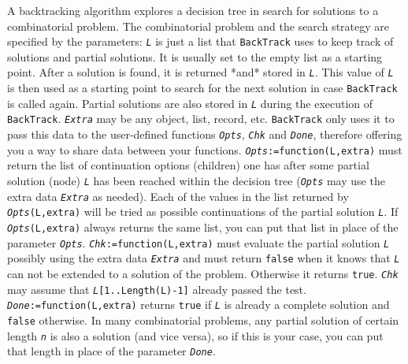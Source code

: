 \documentclass[a4paper,11pt]{report}
\begin{document}
{{{A backtracking algorithm explores a decision tree in search for solutions to a
combinatorial problem. The combinatorial problem and the search strategy are
specified by the parameters: \mbox{\texttt{\mdseries\slshape L}} is just a list that \texttt{BackTrack} uses to keep track of solutions and partial solutions. It is usually set to
the empty list as a starting point. After a solution is found, it is returned
*and* stored in \mbox{\texttt{\mdseries\slshape L}}. This value of \mbox{\texttt{\mdseries\slshape L}} is then used as a starting point to search for the next solution in case \texttt{BackTrack} is called again. Partial solutions are also stored in \mbox{\texttt{\mdseries\slshape L}} during the execution of \texttt{BackTrack}. \mbox{\texttt{\mdseries\slshape Extra}} may be any object, list, record, etc. \texttt{BackTrack} only uses it to pass this data to the user-defined functions \mbox{\texttt{\mdseries\slshape Opts}}, \mbox{\texttt{\mdseries\slshape Chk}} and \mbox{\texttt{\mdseries\slshape Done}}, therefore offering you a way to share data between your functions. \mbox{\texttt{\mdseries\slshape Opts}}\texttt{:=function(L,extra)} must return the list of continuation options (children) one has after some
partial solution (node) \mbox{\texttt{\mdseries\slshape L}} has been reached within the decision tree (\mbox{\texttt{\mdseries\slshape Opts}} may use the extra data \mbox{\texttt{\mdseries\slshape Extra}} as needed). Each of the values in the list returned by \mbox{\texttt{\mdseries\slshape Opts}}\texttt{(L,extra)} will be tried as possible continuations of the partial solution \mbox{\texttt{\mdseries\slshape L}}. If \mbox{\texttt{\mdseries\slshape Opts}}\texttt{(L,extra)} always returns the same list, you can put that list in place of the parameter \mbox{\texttt{\mdseries\slshape Opts}}. \mbox{\texttt{\mdseries\slshape Chk}}\texttt{:=function(L,extra)} must evaluate the partial solution \mbox{\texttt{\mdseries\slshape L}} possibly using the extra data \mbox{\texttt{\mdseries\slshape Extra}} and must return \texttt{false} when it knows that \mbox{\texttt{\mdseries\slshape L}} can not be extended to a solution of the problem. Otherwise it returns \texttt{true}. \mbox{\texttt{\mdseries\slshape Chk}} may assume that \mbox{\texttt{\mdseries\slshape L}}\texttt{\texttt{}[1..Length(L)-1]\texttt{}} already passed the test. \mbox{\texttt{\mdseries\slshape Done}}\texttt{:=function(L,extra)} returns \texttt{true} if \mbox{\texttt{\mdseries\slshape L}} is already a complete solution and \texttt{false} otherwise. In many combinatorial problems, any partial solution of certain
length \mbox{\texttt{\mdseries\slshape n}} is also a solution (and vice versa), so if this is your case, you can put that
length in place of the parameter \mbox{\texttt{\mdseries\slshape Done}}. 

}}}
\end{document}
